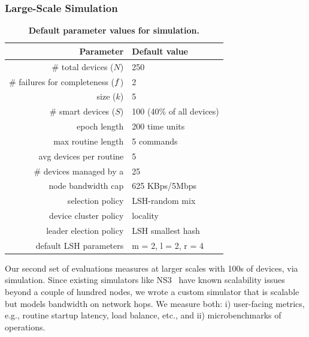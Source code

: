 \subsubsection{Large-Scale Simulation}
\label{comesh:sec:simres}

\begin{table}[tb!]
    \centering
    \footnotesize
    \caption{\bf \small Default parameter values for simulation.}
    \bigskip
    \label{comesh:tab:def_param_vals}
    \begin{tabular}{r l}
        \hline
        \textbf{Parameter} & \textbf{Default value} \\
        \hline
        \# total devices ($N$) & 250 \\
        \# failures for completeness
        ($f$) & 2 \\
        \kgroup{} size ($k$) & 5 \\
        \# smart devices ($S$) & 100 (40\% of all devices) \\
        epoch length & 200 time units \\
        max routine length & 5 commands \\
        avg devices per routine & 5 \\
        \# devices managed by a \Kgroup{}
        & 25 \\
        node bandwidth cap & 625 KBps/5Mbps \\
        \kgroup{} selection policy & LSH-random mix \\
        device cluster policy & locality \\
        leader election policy & LSH smallest hash\\
        default LSH parameters & m = 2, l = 2, r = 4\\
        \hline
    \end{tabular}
\end{table}

Our second set of evaluations measures \sysname{} at larger scales with 100s of devices,
via simulation. Since existing simulators like NS3~\cite{NS3}
have known scalability issues beyond a couple of hundred nodes,  we wrote a custom simulator that is scalable but models bandwidth on network hops.  
We measure both: i) user-facing metrics, e.g., routine startup latency, load balance, etc., and ii) microbenchmarks of \kgroup{} operations.

